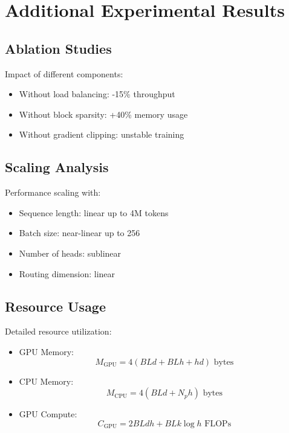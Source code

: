 \documentclass[10pt]{article}
\begin{document}
\section{Additional Experimental Results}

\subsection{Ablation Studies}
Impact of different components:

\begin{itemize}
    \item Without load balancing: -15\% throughput
    \item Without block sparsity: +40\% memory usage
    \item Without gradient clipping: unstable training
\end{itemize}

\subsection{Scaling Analysis}
Performance scaling with:

\begin{itemize}
    \item Sequence length: linear up to 4M tokens
    \item Batch size: near-linear up to 256
    \item Number of heads: sublinear
    \item Routing dimension: linear
\end{itemize}

\subsection{Resource Usage}
Detailed resource utilization:

\begin{itemize}
    \item GPU Memory: 
        \begin{equation}
            M_{\text{GPU}} = 4(BLd + BLh + hd) \text{ bytes}
        \end{equation}
    \item CPU Memory:
        \begin{equation}
            M_{\text{CPU}} = 4(BLd + N_ph) \text{ bytes}
        \end{equation}
    \item GPU Compute:
        \begin{equation}
            C_{\text{GPU}} = 2BLdh + BLk\log h \text{ FLOPs}
        \end{equation}
\end{itemize}
\end{document}
